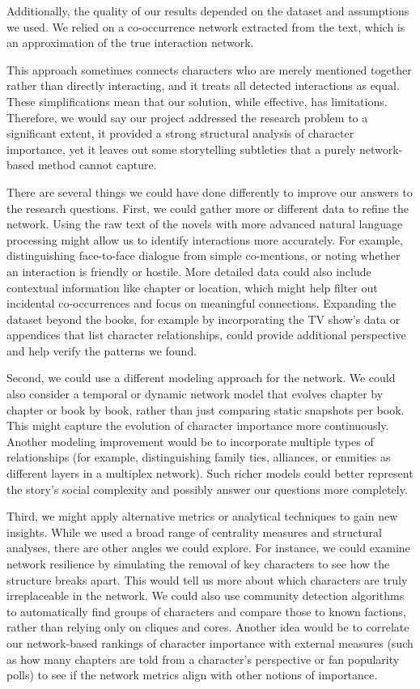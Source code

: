 \documentclass[12pt, a4paper]{article}
\begin{document}
Additionally, the quality of our results depended 
on the dataset and assumptions we used. We relied on a co-occurrence network extracted from the text, which is an approximation of the true interaction network.
 
This approach sometimes connects characters who are merely mentioned together rather than directly interacting, and it treats all detected interactions as
  equal. These simplifications mean that our solution, while effective, has limitations. Therefore, we would say our project addressed the 
  research problem to a significant extent, it provided a strong structural analysis of character importance, 
  yet it leaves out some storytelling subtleties that a purely network-based method cannot capture.

There are several things we could have done differently to improve our answers to the research questions. 
First, we could gather more or different data to refine the network. 
Using the raw text of the novels with more advanced natural language processing might allow us to identify 
interactions more accurately. 
For example, distinguishing face-to-face dialogue from simple co-mentions, 
or noting whether an interaction is friendly or hostile. 
More detailed data could also include contextual information like chapter or location, 
which might help filter out incidental co-occurrences and focus on meaningful connections. 
Expanding the dataset beyond the books, for example by incorporating the TV show’s data or appendices that list character relationships,
could provide additional perspective and help verify the patterns we found. 

Second, we could use a different modeling approach for the network. 
We could also consider a temporal or dynamic network model that evolves chapter by chapter or book by book, 
rather than just comparing static snapshots per book. This might capture the evolution of character importance more continuously.
Another modeling improvement would be to incorporate multiple types of relationships 
(for example, distinguishing family ties, alliances, or enmities as different layers in a multiplex network). 
Such richer models could better represent the story’s social complexity and possibly answer our questions more completely. 

Third, we might apply alternative metrics or analytical techniques to gain new insights. 
While we used a broad range of centrality measures and structural analyses, 
there are other angles we could explore. 
For instance, we could examine network resilience by simulating the removal of key characters to see how the structure breaks apart.
This would tell us more about which characters are truly irreplaceable in the network. 
We could also use community detection algorithms to automatically find groups of characters and compare those to known factions, 
rather than relying only on cliques and cores. 
Another idea would be to correlate our network-based rankings of character importance with external measures 
(such as how many chapters are told from a character’s perspective or fan popularity polls) 
to see if the network metrics align with other notions of importance. 
\end{document}
